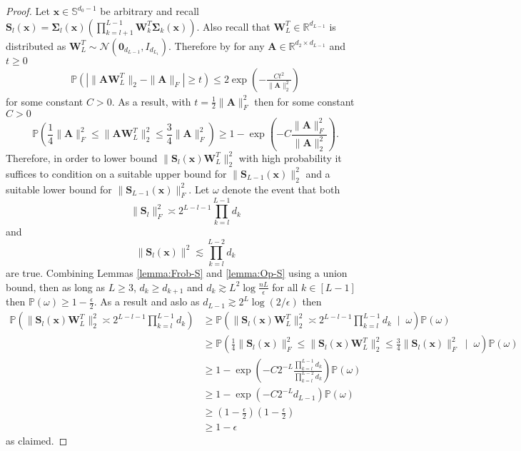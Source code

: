 \documentclass{article}
\theoremstyle{definition}
\newcommand*{\R}{\mathbb{R}}
\renewcommand{\P}{\mathbb{P}}
\renewcommand{\S}{\mathbb{S}}
\def\vx{{\bm{x}}}
\def\mA{{\bm{A}}}
\def\mS{{\bm{S}}}
\def\mW{{\bm{W}}}
\def\mSigma{{\bm{\Sigma}}}
\begin{document}
\begin{proof}
    Let $\vx \in \S^{d_0-1}$ be arbitrary and recall $\mS_{l}(\vx) = \mSigma_l(\vx) \left( \prod_{k = l+1}^{L-1} \mW_k^T \mSigma_k(\vx) \right)$. Also recall that $\mW_L^T \in \R^{d_{L-1}}$ is distributed as $\mW_L^T \sim \mathcal{N}(\textbf{0}_{d_{L-1}}, \textit{I}_{d_{L_1}})$. Therefore by \citet[Theorem 6.3.2]{vershynin2018high} for any $\mA \in \R^{d_2 \times d_{L-1}}$ and $t \geq 0$
    \begin{align*}
        \P( | \|\mA \mW_L^T \|_2 - \|\mA \|_F | \geq t) \leq 2 \exp \left( -\frac{Ct^2}{ \|\mA \|_2^2}\right)
    \end{align*}
    for some constant $C>0$. As a result, with $t = \tfrac{1}{2}\| \mA \|_F^2$ then for some constant $C>0$
    \[
    \P \left( \frac{1}{4} \| \mA \|_F^2 \leq \| \mA \mW_L^T \|_2^2 \leq \frac{3}{4} \| \mA \|_F^2 \right) \geq 1 - \exp\left( -C\frac{\| \mA \|_F^2}{\| \mA \|_2^2}\right).
    \]
    Therefore, in order to lower bound $\| \mS_{l}(\vx) \mW_L^T\|_2^2$ with high probability it suffices to condition on a suitable upper bound for $\| \mS_{L-1}(\vx) \|_2^2$ and a suitable lower bound for $\| \mS_{L-1}(\vx) \|_F^2$. Let $\omega$ denote the event that both
    \[
    \| \mS_l \|_F^2 \asymp 2^{L-l-1}\prod_{k=l}^{L-1} d_k 
    \]
    and 
    \[
    \| \mS_l(\vx) \|^2 \lesssim \prod_{k=l}^{L-2} d_{k} 
    \]
    are true. Combining Lemmas \ref{lemma:Frob-S} and \ref{lemma:Op-S} using a union bound, then as long as $L \geq 3$, $d_k \geq d_{k+1}$ and $d_k \gtrsim L^2\log \frac{nL}{\epsilon}$ for all $k \in [L - 1]$ then $\P(\omega) \geq 1 - \tfrac{\epsilon}{2}$. As a result and aslo as $d_{L-1} \gtrsim 2^L \log(2 / \epsilon)$ then 
    \begin{align*}
    \P \left(  \| \mS_l(\vx)  \mW_L^T \|_2^2 \asymp 2^{L-l-1}\prod_{k=l}^{L-1} d_k  \right) & \geq \P \left(  \| \mS_l(\vx)  \mW_L^T \|_2^2 \asymp 2^{L-l-1}\prod_{k=l}^{L-1} d_k \; \mid \; \omega  \right) \P(\omega)\\
    & \geq \P \left( \frac{1}{4} \| \mS_l(\vx)  \|_F^2 \leq \| \mS_l(\vx)  \mW_L^T \|_2^2 \leq \frac{3}{4} \| \mS_l(\vx) \|_F^2  \; \mid \; \omega \right)  \P(\omega) \\
    &\geq 1 - \exp\left( -C 2^{-L} \frac{ \prod_{k=l}^{L-1} d_k}{\prod_{k=l}^{L-2} d_{k}} \right)\P(\omega)\\
    & \geq 1 - \exp\left( -C 2^{-L} d_{L-1} \right)\P(\omega)\\
    & \geq \left(1 - \frac{\epsilon}{2} \right)\left(1 - \frac{\epsilon}{2} \right)\\
    & \geq 1 - \epsilon
    \end{align*}
    as claimed.
\end{proof}
\end{document}
